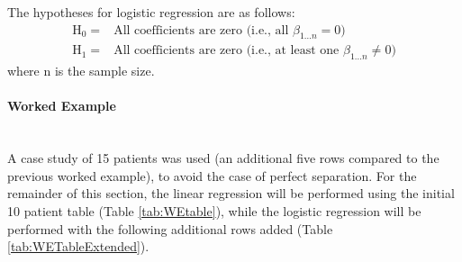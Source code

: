 \documentclass[../thesis.tex]{subfiles}
\begin{document}
The hypotheses for logistic regression are as follows:
\begin{align}
    \text{H}_{0} =& \text{All coefficients are zero (i.e., all $\beta_{1...n} = 0$)}\\
    \text{H}_{1} =& \text{All coefficients are zero (i.e., at least one $\beta_{1...n} \neq 0$)}
\end{align}
where n is the sample size.

\paragraph{Worked Example}\\
A case study of 15 patients was used (an additional five rows compared to the previous worked example), to avoid the case of perfect separation. For the remainder of this section, the linear regression will be performed using the initial 10 patient table (Table \ref{tab:WEtable}), while the logistic regression will be performed with the following additional rows added (Table \ref{tab:WETableExtended}).
\end{document}

